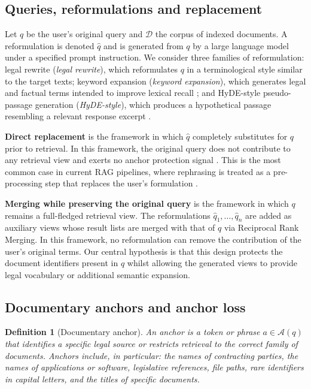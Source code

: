 \documentclass[a4paper,fleqn]{cas-dc}
\newtheorem{definition}{Definition}
\begin{document}
\subsection{Queries, reformulations and replacement}
 
Let $q$ be the user’s original query and $\mathcal{D}$ the corpus of
indexed documents. A reformulation is denoted $\hat{q}$ and is generated from
$q$ by a large language model under a specified prompt instruction.
We consider three families of reformulation: legal rewrite
(\textit{legal rewrite}), which reformulates $q$ in a terminological style similar
to the target texts; keyword expansion (\textit{keyword expansion}), which
generates legal and factual terms intended to improve lexical recall
; and HyDE-style pseudo-passage generation (\textit{HyDE-style}),
which produces a hypothetical passage resembling a relevant response
excerpt \citep{gao2023hyde}.
 
\textbf{Direct replacement} is the framework in which $\hat{q}$ completely substitutes
for $q$ prior to retrieval. In this framework, the original query does not
contribute to any retrieval view and exerts no anchor protection signal
. This is the most common case in current RAG pipelines, where
rephrasing is treated as a pre-processing step that replaces the user’s formulation
.
 
\textbf{Merging while preserving the original query} is the framework in which $q$
remains a full-fledged retrieval view. The reformulations
$\hat{q}_1, \ldots, \hat{q}_n$ are added as auxiliary views whose
result lists are merged with that of $q$ via Reciprocal Rank
Merging. In this framework, no reformulation can remove the contribution
of the user’s original terms. Our central hypothesis is that this
design protects the document identifiers present in $q$ whilst
allowing the generated views to provide legal vocabulary or additional
semantic expansion.
 
\subsection{Documentary anchors and anchor loss}
 
\begin{definition}[Documentary anchor]
An anchor is a token or phrase $a \in \mathcal{A}(q)$ that identifies a
specific legal source or restricts retrieval to the correct family of
documents. Anchors include, in particular: the names of 
contracting parties, the names of applications or software, legislative
references, file paths, rare identifiers
in capital letters, and the titles of specific documents.
\end{definition}
 
\end{document}

